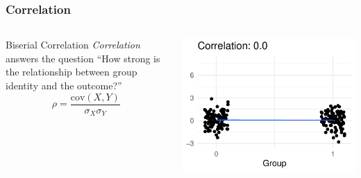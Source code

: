 \documentclass[12pt, block=fill]{beamer}
\newcommand{\cov}{\text{cov}}
\begin{document}
\begin{frame}
  \frametitle{Correlation}
  \begin{columns}
      \begin{block}{Biserial Correlation}
        \textit{Correlation} answers the question ``How strong is the
        relationship between group identity and the outcome?''
        \[
          \rho = \frac{\cov(X, Y)}{\sigma_{X}\sigma_{Y}}
        \]
      \end{block}
      \begin{center}
        \includegraphics[width = 0.9\linewidth]{./figures/biserial_00}
      \end{center}
  \end{columns}
\end{frame}
\end{document}
